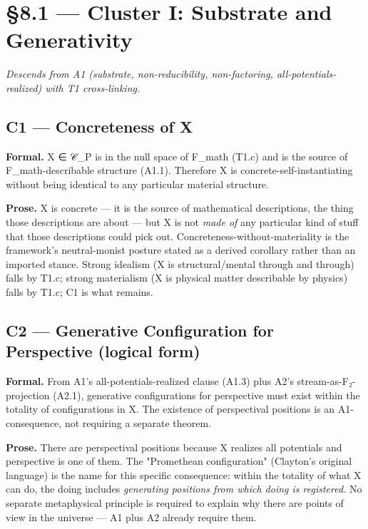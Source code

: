 \documentclass[11pt, openany]{book}
\newcommand{\sectionbreak}{\clearpage}
\begin{document}
\sectionbreak

\section{§8.1 --- Cluster I: Substrate and Generativity}

\textit{Descends from A1 (substrate, non-reducibility, non-factoring, all-potentials-realized) with T1 cross-linking.}

\subsection{C1 --- Concreteness of X}

\textbf{Formal.} X ∈ 𝒞\_\allowbreak{}P is in the null space of F\_\allowbreak{}math (T1.c) and is the source of F\_\allowbreak{}math-describable structure (A1.1). Therefore X is concrete-self-instantiating without being identical to any particular material structure.

\textbf{Prose.} X is concrete --- it is the source of mathematical descriptions, the thing those descriptions are about --- but X is not \textit{made of} any particular kind of stuff that those descriptions could pick out. Concreteness-without-materiality is the framework's neutral-monist posture stated as a derived corollary rather than an imported stance. Strong idealism (X is structural/mental through and through) falls by T1.c; strong materialism (X is physical matter describable by physics) falls by T1.c; C1 is what remains.

\subsection{C2 --- Generative Configuration for Perspective (logical form)}

\textbf{Formal.} From A1's all-potentials-realized clause (A1.3) plus A2's stream-as-F₂-projection (A2.1), generative configurations for perspective must exist within the totality of configurations in X. The existence of perspectival positions is an A1-consequence, not requiring a separate theorem.

\textbf{Prose.} There are perspectival positions because X realizes all potentials and perspective is one of them. The "Promethean configuration" (Clayton's original language) is the name for this specific consequence: within the totality of what X can do, the doing includes \textit{generating positions from which doing is registered.} No separate metaphysical principle is required to explain why there are points of view in the universe --- A1 plus A2 already require them.
\end{document}
